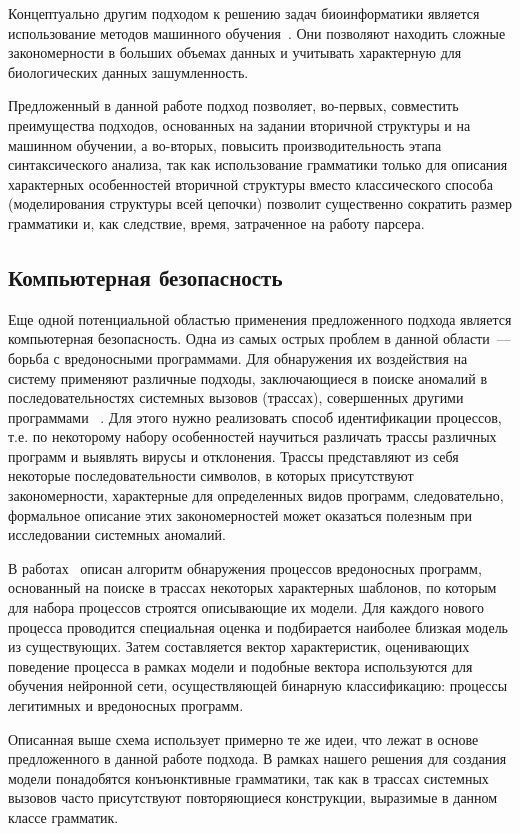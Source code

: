 Концептуально другим подходом к решению задач биоинформатики является использование методов машинного обучения~\cite{ANN,Humidor}. Они позволяют находить сложные закономерности в больших объемах данных и учитывать характерную для биологических данных зашумленность.

Предложенный в данной работе подход позволяет, во-первых, совместить преимущества подходов, основанных на задании вторичной структуры и на машинном обучении, а во-вторых, повысить производительность этапа синтаксического анализа, так как использование грамматики только для описания характерных особенностей вторичной структуры вместо классического способа (моделирования структуры всей цепочки) позволит существенно сократить размер грамматики и, как следствие, время, затраченное на работу парсера.

\subsection{Компьютерная безопасность}
Еще одной потенциальной областью применения предложенного подхода является компьютерная безопасность. Одна из самых острых проблем в данной области~--- борьба с вредоносными программами. Для обнаружения их воздействия на систему применяют различные подходы, заключающиеся в поиске аномалий в последовательностях системных вызовов (трассах), совершенных другими программами ~\cite{ghosh1999study,hofmeyr1998intrusion,wespi2000intrusion}. Для этого нужно реализовать способ идентификации процессов, т.е. по некоторому набору особенностей научиться различать трассы различных программ и выявлять вирусы и отклонения. Трассы представляют из себя некоторые последовательности символов, в которых присутствуют закономерности, характерные для определенных видов программ, следовательно, формальное описание этих закономерностей может оказаться полезным при исследовании системных аномалий.

В работах~\cite{baklanovsk2015,baklanovsk2016} описан алгоритм обнаружения процессов вредоносных программ, основанный на поиске в трассах некоторых характерных шаблонов, по которым для набора процессов строятся описывающие их модели. Для каждого нового процесса проводится специальная оценка и подбирается наиболее близкая модель из существующих. Затем составляется вектор характеристик, оценивающих поведение процесса в рамках модели и подобные вектора используются для обучения нейронной сети, осуществляющей бинарную классификацию: процессы легитимных и вредоносных программ.

Описанная выше схема использует примерно те же идеи, что лежат в основе предложенного в данной работе подхода. В рамках нашего решения для создания модели понадобятся конъюнктивные грамматики, так как в трассах системных вызовов часто присутствуют повторяющиеся конструкции, выразимые в данном классе грамматик.

